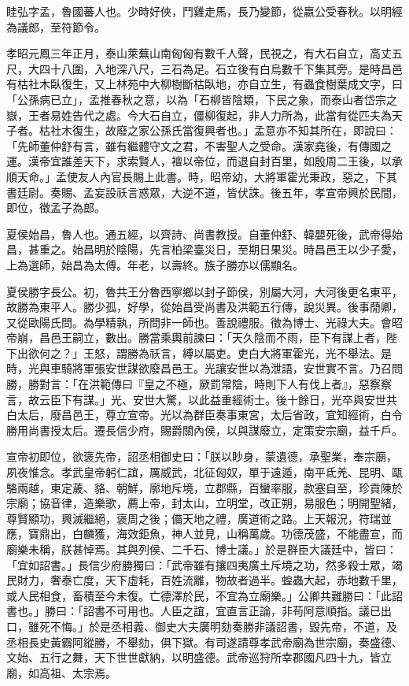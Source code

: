 
\begin{pinyinscope}
眭弘字孟，魯國蕃人也。少時好俠，鬥雞走馬，長乃變節，從嬴公受春秋。以明經為議郎，至符節令。

孝昭元鳳三年正月，泰山萊蕪山南匈匈有數千人聲，民視之，有大石自立，高丈五尺，大四十八圍，入地深八尺，三石為足。石立後有白烏數千下集其旁。是時昌邑有枯社木臥復生，又上林苑中大柳樹斷枯臥地，亦自立生，有蟲食樹葉成文字，曰「公孫病已立」，孟推春秋之意，以為「石柳皆陰類，下民之象，而泰山者岱宗之嶽，王者易姓告代之處。今大石自立，僵柳復起，非人力所為，此當有從匹夫為天子者。枯社木復生，故廢之家公孫氏當復興者也。」孟意亦不知其所在，即說曰：「先師董仲舒有言，雖有繼體守文之君，不害聖人之受命。漢家堯後，有傳國之運。漢帝宜誰差天下，求索賢人，襢以帝位，而退自封百里，如殷周二王後，以承順天命。」孟使友人內官長賜上此書。時，昭帝幼，大將軍霍光秉政，惡之，下其書廷尉。奏賜、孟妄設祅言惑眾，大逆不道，皆伏誅。後五年，孝宣帝興於民間，即位，徵孟子為郎。

夏侯始昌，魯人也。通五經，以齊詩、尚書教授。自董仲舒、韓嬰死後，武帝得始昌，甚重之。始昌明於陰陽，先言柏梁臺災日，至期日果災。時昌邑王以少子愛，上為選師，始昌為太傅。年老，以壽終。族子勝亦以儒顯名。

夏侯勝字長公。初，魯共王分魯西寧鄉以封子節侯，別屬大河，大河後更名東平，故勝為東平人。勝少孤，好學，從始昌受尚書及洪範五行傳，說災異。後事蕑卿，又從歐陽氏問。為學精孰，所問非一師也。善說禮服。徵為博士、光祿大夫。會昭帝崩，昌邑王嗣立，數出。勝當乘輿前諫曰：「天久陰而不雨，臣下有謀上者，陛下出欲何之？」王怒，謂勝為祅言，縛以屬吏。吏白大將軍霍光，光不舉法。是時，光與車騎將軍張安世謀欲廢昌邑王。光讓安世以為泄語，安世實不言。乃召問勝，勝對言：「在洪範傳曰『皇之不極，厥罰常陰，時則下人有伐上者』，惡察察言，故云臣下有謀。」光、安世大驚，以此益重經術士。後十餘日，光卒與安世共白太后，廢昌邑王，尊立宣帝。光以為群臣奏事東宮，太后省政，宜知經術，白令勝用尚書授太后。遷長信少府，賜爵關內侯，以與謀廢立，定策安宗廟，益千戶。

宣帝初即位，欲褒先帝，詔丞相御史曰：「朕以眇身，蒙遺德，承聖業，奉宗廟，夙夜惟念。孝武皇帝躬仁誼，厲威武，北征匈奴，單于遠遁，南平氐羌、昆明、甌駱兩越，東定薉、貉、朝鮮，廓地斥境，立郡縣，百蠻率服，款塞自至，珍貢陳於宗廟；協音律，造樂歌，薦上帝，封太山，立明堂，改正朔，易服色；明開聖緒，尊賢顯功，興滅繼絕，褒周之後；備天地之禮，廣道術之路。上天報況，符瑞並應，寶鼎出，白麟獲，海效鉅魚，神人並見，山稱萬歲。功德茂盛，不能盡宣，而廟樂未稱，朕甚悼焉。其與列侯、二千石、博士議。」於是群臣大議廷中，皆曰：「宜如詔書。」長信少府勝獨曰：「武帝雖有攘四夷廣土斥境之功，然多殺士眾，竭民財力，奢泰亡度，天下虛耗，百姓流離，物故者過半。蝗蟲大起，赤地數千里，或人民相食，畜積至今未復。亡德澤於民，不宜為立廟樂。」公卿共難勝曰：「此詔書也。」勝曰：「詔書不可用也。人臣之誼，宜直言正論，非苟阿意順指。議已出口，雖死不悔。」於是丞相義、御史大夫廣明劾奏勝非議詔書，毀先帝，不道，及丞相長史黃霸阿縱勝，不舉劾，俱下獄。有司遂請尊孝武帝廟為世宗廟，奏盛德、文始、五行之舞，天下世世獻納，以明盛德。武帝巡狩所幸郡國凡四十九，皆立廟，如高祖、太宗焉。


\end{pinyinscope}
